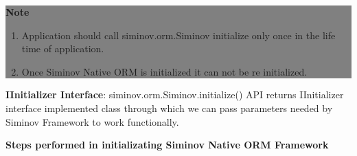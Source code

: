 		\begin{center}
			\colorbox{grey}{
				\parbox[t]{.8\linewidth}{
					\fontsize{11pt}{11pt}\selectfont %
					\vspace*{0.1cm} %
		
					\hfill \textbf{Note} \\

					\begin{enumerate}

						\item \small Application should call siminov.orm.Siminov initialize only once in the life time of application.

						\item \small Once Siminov Native ORM is initialized it can not be re initialized.

					\end{enumerate}

					\vspace*{0.0cm} %
				}
			}

		\end{center}


\par
\textbf{IInitializer Interface}: 
siminov.orm.Siminov.initialize() API returns IInitializer interface implemented class through which we can pass parameters needed by Siminov Framework to work functionally. 

	


\par
\textbf{Steps performed in initializating Siminov Native ORM Framework}

